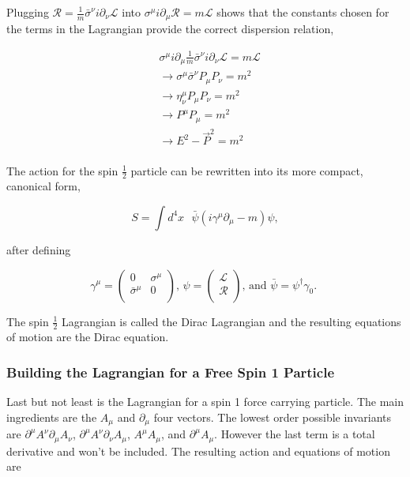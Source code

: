 Plugging $\mathcal{R} = \frac{1}{m}\bar{\sigma}^\nu i\partial_\nu\mathcal{L}$ into $\sigma^\mu i\partial_\mu\mathcal{R} = m\mathcal{L}$ shows that the constants chosen for the terms in the Lagrangian provide the correct dispersion relation,

\begin{equation}
\begin{split}
&\sigma^\mu i\partial_\mu \frac{1}{m}\bar{\sigma}^\nu i\partial_\nu\mathcal{L} = m\mathcal{L} \\
&\rightarrow \sigma^\mu \bar{\sigma}^\nu P_\mu P_\nu = m^2 \\
&\rightarrow \eta^\mu_\nu P_\mu P_\nu = m^2 \\
&\rightarrow P^\mu P_\mu = m^2 \\
&\rightarrow E^2 - \vec{P}^2 = m^2 \\
\end{split}
\end{equation}


The action for the spin $\frac{1}{2}$ particle can be rewritten into its more compact, canonical form,

\begin{equation}
S = \int d^4x \text{ } \bar{\psi} \left(i\gamma^\mu\partial_\mu - m\right)\psi,
\end{equation} 

after defining

\begin{equation}
\gamma^\mu =
\begin{pmatrix}
0 & \sigma^\mu \\
\bar{\sigma}^\mu & 0 \\
\end{pmatrix}
\text{, } 
\psi =
\begin{pmatrix}
\mathcal{L} \\
\mathcal{R} \\
\end{pmatrix}
\text{, and } 
\bar{\psi} =
\psi^\dagger \gamma_0 \text{. }
\end{equation}

The spin $\frac{1}{2}$ Lagrangian is called the Dirac Lagrangian and the resulting equations of motion are the Dirac equation.

\subsubsection{Building the Lagrangian for a Free Spin 1 Particle}
Last but not least is the Lagrangian for a spin 1 force carrying particle. The main ingredients are the $A_\mu$ and $\partial_\mu$ four vectors. The lowest order possible invariants are $\partial^\mu A^\nu\partial_\mu A_\nu$, $\partial^\mu A^\nu\partial_\nu A_\mu$, $A^\mu A_\mu$, and $\partial^\mu A_\mu$. However the last term is a total derivative and won't be included. The resulting action and equations of motion are 


